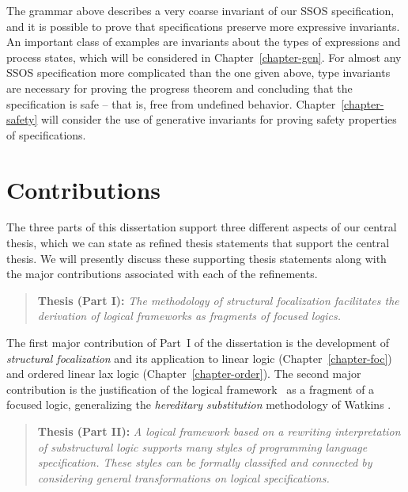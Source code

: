 The grammar above describes a very coarse invariant of our SSOS
specification, and it is possible to prove that specifications
preserve more expressive invariants. An important class of examples
are invariants about the types of expressions and process states,
which will be considered in Chapter~\ref{chapter-gen}.  For almost any
SSOS specification more complicated than the one given above, type
invariants are necessary for proving the progress theorem and
concluding that the specification is safe -- that is, free from
undefined behavior.  Chapter~\ref{chapter-safety} will consider the
use of generative invariants for proving safety properties of
specifications.

\section{Contributions}

The three parts of this dissertation support three different
aspects of our central thesis, which we can state as refined thesis
statements that support the central thesis. We will presently discuss
these supporting thesis statements along with the major contributions
associated with each of the refinements.

\smallskip
\begin{quote} {\bf Thesis (Part I):} {\it The methodology of
    structural focalization facilitates the derivation of logical
    frameworks as fragments of focused logics.}
\end{quote}
\smallskip

\noindent
The first major contribution of Part~I of the dissertation is the
development of {\it structural focalization} and its application
to linear logic (Chapter~\ref{chapter-foc}) and ordered linear lax
logic (Chapter~\ref{chapter-order}). The second major contribution is
the justification of the logical framework \sls~as a fragment of a
focused logic, generalizing the {\it hereditary substitution}
methodology of Watkins \cite{watkins02concurrent}.

\smallskip
\begin{quote} 
  {\bf Thesis (Part II):} {\it A logical framework based on a rewriting
  interpretation of substructural logic supports many styles of
  programming language specification. These styles can be formally
  classified and connected by considering general transformations on
  logical specifications.}
\end{quote} 
\smallskip

